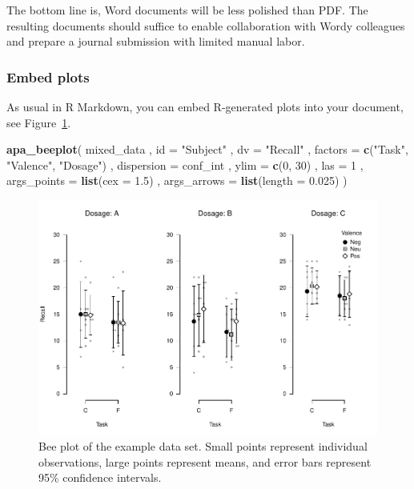 \documentclass[
  man,floatsintext]{apa6}
\newenvironment{Shaded}{\begin{snugshade}}{\end{snugshade}}
\newcommand{\AttributeTok}[1]{\textcolor[rgb]{0.13,0.29,0.53}{#1}}
\newcommand{\DecValTok}[1]{\textcolor[rgb]{0.00,0.00,0.81}{#1}}
\newcommand{\FloatTok}[1]{\textcolor[rgb]{0.00,0.00,0.81}{#1}}
\newcommand{\FunctionTok}[1]{\textcolor[rgb]{0.13,0.29,0.53}{\textbf{#1}}}
\newcommand{\NormalTok}[1]{#1}
\newcommand{\StringTok}[1]{\textcolor[rgb]{0.31,0.60,0.02}{#1}}
\begin{document}
The bottom line is, Word documents will be less polished than PDF.
The resulting documents should suffice to enable collaboration with Wordy colleagues and prepare a journal submission with limited manual labor.

\subsubsection{Embed plots}\label{embed-plots}

As usual in R Markdown, you can embed R-generated plots into your document, see Figure~\ref{fig:beeplot}.



\begin{Shaded}
\begin{Highlighting}[]
\FunctionTok{apa\_beeplot}\NormalTok{(}
\NormalTok{  mixed\_data}
\NormalTok{  , }\AttributeTok{id =} \StringTok{"Subject"}
\NormalTok{  , }\AttributeTok{dv =} \StringTok{"Recall"}
\NormalTok{  , }\AttributeTok{factors =} \FunctionTok{c}\NormalTok{(}\StringTok{"Task"}\NormalTok{, }\StringTok{"Valence"}\NormalTok{, }\StringTok{"Dosage"}\NormalTok{)}
\NormalTok{  , }\AttributeTok{dispersion =}\NormalTok{ conf\_int}
\NormalTok{  , }\AttributeTok{ylim =} \FunctionTok{c}\NormalTok{(}\DecValTok{0}\NormalTok{, }\DecValTok{30}\NormalTok{)}
\NormalTok{  , }\AttributeTok{las =} \DecValTok{1}
\NormalTok{  , }\AttributeTok{args\_points =} \FunctionTok{list}\NormalTok{(}\AttributeTok{cex =} \FloatTok{1.5}\NormalTok{)}
\NormalTok{  , }\AttributeTok{args\_arrows =} \FunctionTok{list}\NormalTok{(}\AttributeTok{length =} \FloatTok{0.025}\NormalTok{)}
\NormalTok{)}
\end{Highlighting}
\end{Shaded}

\begin{figure}
\centering
\includegraphics{example_files/figure-latex/beeplot-1.pdf}
\caption{\label{fig:beeplot}Bee plot of the example data set. Small points represent individual observations, large points represent means, and error bars represent 95\% confidence intervals.}
\end{figure}
\end{document}
